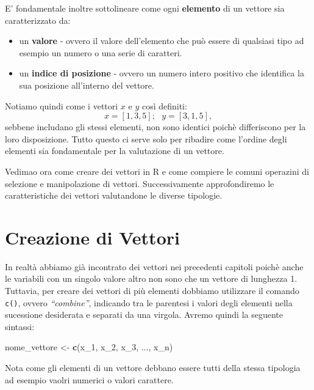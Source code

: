 \documentclass[
]{book}
\newenvironment{Shaded}{\begin{snugshade}}{\end{snugshade}}
\newcommand{\DecValTok}[1]{\textcolor[rgb]{0.00,0.00,0.81}{#1}}
\newcommand{\KeywordTok}[1]{\textcolor[rgb]{0.13,0.29,0.53}{\textbf{#1}}}
\newcommand{\NormalTok}[1]{#1}
\newcommand{\StringTok}[1]{\textcolor[rgb]{0.31,0.60,0.02}{#1}}
\providecommand{\tightlist}{%
  \setlength{\itemsep}{0pt}\setlength{\parskip}{0pt}}
\begin{document}
E' fondamentale inoltre sottolineare come ogni \textbf{elemento} di un vettore sia caratterizzato da:

\begin{itemize}
\tightlist
\item
  un \textbf{valore} - ovvero il valore dell'elemento che può essere di qualsiasi tipo ad esempio un numero o una serie di caratteri.
\item
  un \textbf{indice di posizione} - ovvero un numero intero positivo che identifica la sua posizione all'interno del vettore.
\end{itemize}

Notiamo quindi come i vettori \(x\) e \(y\) così definiti:
\[
x = [1, 3, 5];\ \ \ y = [3, 1, 5],
\]
sebbene includano gli stessi elementi, non sono identici poichè differiscono per la loro disposizione. Tutto questo ci serve solo per ribadire come l'ordine degli elementi sia fondamentale per la valutazione di un vettore.

Vedimao ora come creare dei vettori in R e come compiere le comuni operazini di selezione e manipolazione di vettori. Successivamente approfondiremo le caratteristiche dei vettori valutandone le diverse tipologie.

\hypertarget{creazione-di-vettori}{%
\section{Creazione di Vettori}\label{creazione-di-vettori}}

In realtà abbiamo già incontrato dei vettori nei precedenti capitoli poichè anche le variabili con un singolo valore altro non sono che un vettore di lunghezza 1. Tuttavia, per creare dei vettori di più elementi dobbiamo utilizzare il comando \texttt{c()}, ovvero \emph{``combine''}, indicando tra le parentesi i valori degli elementi nella sucessione desiderata e separati da una virgola. Avremo quindi la seguente sintassi:

\begin{Shaded}
\begin{Highlighting}[]
\NormalTok{nome_vettore <-}\StringTok{ }\KeywordTok{c}\NormalTok{(x_}\DecValTok{1}\NormalTok{, x_}\DecValTok{2}\NormalTok{, x_}\DecValTok{3}\NormalTok{, ..., x_n)}
\end{Highlighting}
\end{Shaded}

Nota come gli elementi di un vettore debbano essere tutti della stessa tipologia ad esempio vaolri numerici o valori carattere.
\end{document}
